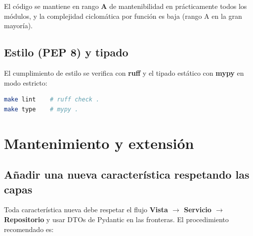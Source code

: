 \documentclass[12pt,letterpaper]{report}
\begin{document}
El código se mantiene en rango \textbf{A} de mantenibilidad en prácticamente todos
los módulos, y la complejidad ciclomática por función es baja (rango A en la gran
mayoría).

\section{Estilo (PEP 8) y tipado}

El cumplimiento de estilo se verifica con \textbf{ruff} y el tipado estático con
\textbf{mypy} en modo estricto:

\begin{lstlisting}[language=bash]
make lint    # ruff check .
make type    # mypy .
\end{lstlisting}

\chapter{Mantenimiento y extensión}

\section{Añadir una nueva característica respetando las capas}

Toda característica nueva debe respetar el flujo \textbf{Vista $\rightarrow$
Servicio $\rightarrow$ Repositorio} y usar DTOs de Pydantic en las fronteras. El
procedimiento recomendado es:
\end{document}
